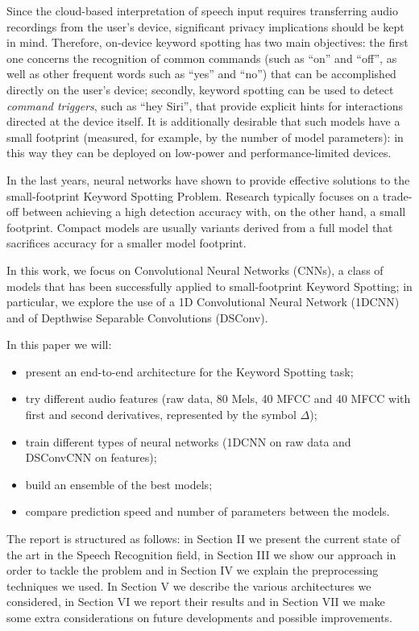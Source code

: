\documentclass[conference]{IEEEtran}
\begin{document}
Since the cloud-based interpretation of speech input requires transferring audio recordings from the user’s device, significant privacy implications should be kept in mind. Therefore, on-device keyword spotting has two main objectives: the first one concerns the recognition of common commands (such as “on” and “off”, as well as other frequent words such as “yes” and “no”) that can be accomplished directly on the user’s device; secondly, keyword spotting can be used to detect \textit{command triggers}, such as “hey Siri”, that provide explicit hints for interactions directed at the device itself. It is additionally desirable that such models have a small footprint (measured, for example, by the number of model parameters): in this way they can be deployed on low-power and performance-limited devices.

In the last years, neural networks have shown to provide effective solutions to the small-footprint Keyword Spotting Problem. Research typically focuses on a trade-off between achieving a high detection accuracy with, on the other hand, a small footprint. Compact models are usually variants derived from a full model that sacrifices accuracy for a smaller model footprint.

In this work, we focus on Convolutional Neural Networks (CNNs), a class of models that has been successfully applied to small-footprint Keyword Spotting; in particular, we explore the use of a 1D Convolutional Neural Network (1DCNN) and of Depthwise Separable Convolutions (DSConv).

In this paper we will: 
\begin{itemize}
\setlength{\itemsep}{0pt}
  \setlength{\parskip}{0pt}
  \setlength{\parsep}{0pt}
\item present an end-to-end architecture for the Keyword Spotting task;
\item try different audio features (raw data, 80 Mels, 40 MFCC and 40 MFCC with first and second derivatives, represented by the symbol $\Delta$);
\item train different types of neural networks (1DCNN on raw data and DSConvCNN on features);
\item build an ensemble of the best models;
\item compare prediction speed and number of parameters between the models.
\end{itemize}

The report is structured as follows: in Section II we present the current state of the art in the Speech Recognition field, in Section III we show our approach in order to tackle the problem and in Section IV we explain the preprocessing techniques we used. In Section V we describe the various architectures we considered, in Section VI we report their results and in Section VII we make some extra considerations on future developments and possible improvements.
\end{document}
